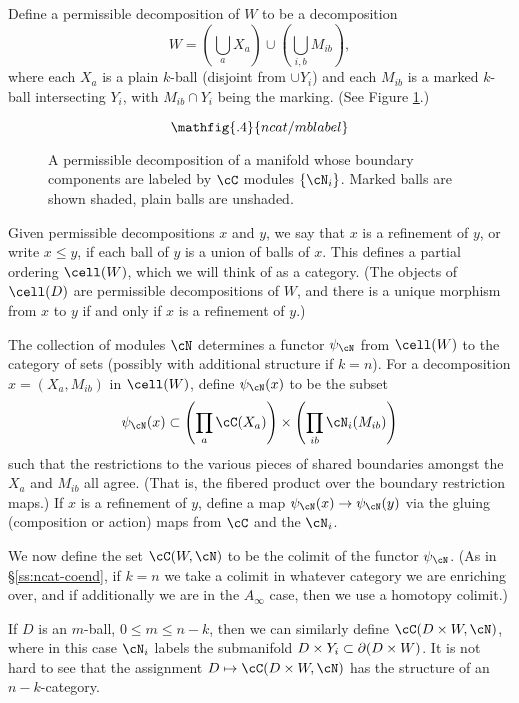 Define a permissible decomposition of $W$ to be a decomposition
\[
	W = \left(\bigcup_a X_a\right) \cup \left(\bigcup_{i,b} M_{ib}\right) ,
\]
where each $X_a$ is a plain $k$-ball (disjoint from $\cup Y_i$) and
each $M_{ib}$ is a marked $k$-ball intersecting $Y_i$,
with $M_{ib}\cap Y_i$ being the marking.
(See Figure \ref{mblabel}.)
\begin{figure}[t]
\begin{equation*}
\mathfig{.4}{ncat/mblabel}
\end{equation*}
\caption{A permissible decomposition of a manifold
whose boundary components are labeled by $\cC$ modules $\{\cN_i\}$.
Marked balls are shown shaded, plain balls are unshaded.}\label{mblabel}
\end{figure}
Given permissible decompositions $x$ and $y$, we say that $x$ is a refinement
of $y$, or write $x \le y$, if each ball of $y$ is a union of balls of $x$.
This defines a partial ordering $\cell(W)$, which we will think of as a category.
(The objects of $\cell(D)$ are permissible decompositions of $W$, and there is a unique
morphism from $x$ to $y$ if and only if $x$ is a refinement of $y$.)

The collection of modules $\cN$ determines 
a functor $\psi_\cN$ from $\cell(W)$ to the category of sets 
(possibly with additional structure if $k=n$).
For a decomposition $x = (X_a, M_{ib})$ in $\cell(W)$, define $\psi_\cN(x)$ to be the subset
\[
	\psi_\cN(x) \sub \left(\prod_a \cC(X_a)\right) \times \left(\prod_{ib} \cN_i(M_{ib})\right)
\]
such that the restrictions to the various pieces of shared boundaries amongst the
$X_a$ and $M_{ib}$ all agree.
(That is, the fibered product over the boundary restriction maps.)
If $x$ is a refinement of $y$, define a map $\psi_\cN(x)\to\psi_\cN(y)$
via the gluing (composition or action) maps from $\cC$ and the $\cN_i$.

We now define the set $\cC(W, \cN)$ to be the colimit of the functor $\psi_\cN$.
(As in \S\ref{ss:ncat-coend}, if $k=n$ we take a colimit in whatever
category we are enriching over, and if additionally we are in the $A_\infty$ case, 
then we use a homotopy colimit.)

\medskip

If $D$ is an $m$-ball, $0\le m \le n-k$, then we can similarly define
$\cC(D\times W, \cN)$, where in this case $\cN_i$ labels the submanifold 
$D\times Y_i \subset \partial(D\times W)$.
It is not hard to see that the assignment $D \mapsto \cC(D\times W, \cN)$
has the structure of an $n{-}k$-category.

